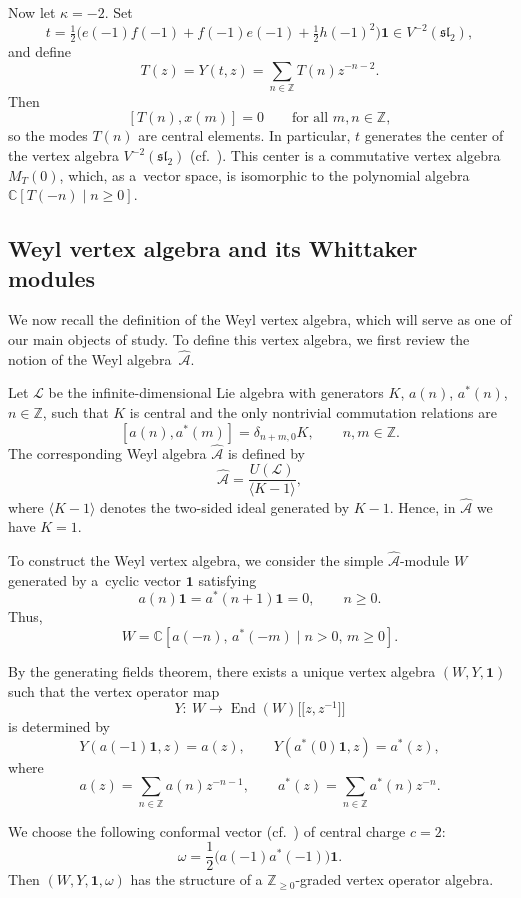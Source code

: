 \documentclass[pdftex]{sigma}
\numberwithin{equation}{section}
\theoremstyle{definition}
\newcommand{\1}{\textbf{1}}
\begin{document}
Now let $\kappa = -2$.
Set
\[
 t = \tfrac{1}{2}\bigl( e(-1)f(-1) + f(-1)e(-1) + \tfrac{1}{2}h(-1)^2 \bigr)\mathbf{1}
 \in V^{-2}(\mathfrak{sl}_2),
\]
and define
\[
 T(z) = Y(t,z) = \sum_{n \in \mathbb{Z}} T(n) z^{-n-2}.
\]
Then
\[
 [T(n), x(m)] = 0 \qquad \text{for all } m,n \in \mathbb{Z},
\]
so the modes $T(n)$ are central elements.
In particular, $t$ generates the center of the vertex algebra $V^{-2}(\mathfrak{sl}_2)$
(cf.~\cite{efren,FB}).
This center is a commutative vertex algebra $M_T(0)$, which, as a~vector space, is isomorphic to the polynomial algebra
$ \mathbb{C}[ T(-n) \mid n \ge 0 ]$.

\subsection{Weyl vertex algebra and its Whittaker modules}
\label{Weyl}

We now recall the definition of the Weyl vertex algebra, which will serve as one of our main objects of study.
To define this vertex algebra, we first review the notion of the Weyl algebra~$\widehat{\mathcal{A}}$.

Let $\mathcal{L}$ be the infinite-dimensional Lie algebra with generators
$K$, $a(n)$, $a^{*}(n)$, $n \in \mathbb{Z}$,
such that $K$ is central and the only nontrivial commutation relations are
\[
 [a(n), a^{*}(m)] = \delta_{n+m,0} K, \qquad n,m \in \mathbb{Z}.
\]
The corresponding Weyl algebra $\widehat{\mathcal{A}}$ is defined by{\samepage
\[
 \widehat{\mathcal{A}} = \frac{U(\mathcal{L})}{\langle K - 1 \rangle},
\]
where $\langle K - 1 \rangle$ denotes the two-sided ideal generated by $K - 1$.
Hence, in $\widehat{\mathcal{A}}$ we have $K = 1$.}

To construct the Weyl vertex algebra, we consider the simple $\widehat{\mathcal{A}}$-module $W$ generated by a~cyclic vector $\mathbf{1}$ satisfying
\[
 a(n)\mathbf{1} = a^{*}(n+1)\mathbf{1} = 0, \qquad n \ge 0.
\]
Thus,
\[
 W= \mathbb{C}[ a(-n),\, a^{*}(-m) \mid n > 0,\, m \ge 0 ].
\]


By the generating fields theorem, there exists a unique vertex algebra $(W, Y, \mathbf{1})$
such that the vertex operator map
\[
 Y\colon \ W\longrightarrow \operatorname{End}(W)\bigl[\bigl[z, z^{-1}\bigr]\bigr]
\]
is determined by
\[
 Y(a(-1)\mathbf{1}, z) = a(z), \qquad Y(a^{*}(0)\mathbf{1}, z) = a^{*}(z),
\]
where
\[
 a(z) = \sum_{n \in \mathbb{Z}} a(n) z^{-n-1},
 \qquad
 a^{*}(z) = \sum_{n \in \mathbb{Z}} a^{*}(n) z^{-n}.
\]

We choose the following conformal vector (cf.~\cite{KR}) of central charge $c = 2$:
\[
 \omega = \frac{1}{2}\bigl(a(-1)a^{*}(-1) \bigr)\mathbf{1}.
\]
Then $(W, Y, \mathbf{1}, \omega)$ has the structure of a
$ \mathbb{Z}_{\ge 0}$-graded vertex operator algebra.
\end{document}
